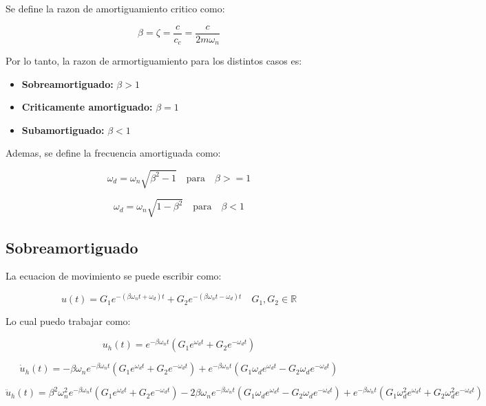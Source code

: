\documentclass{article}  %
\begin{document}
Se define la razon de amortiguamiento critico como:

\begin{equation}
    \beta = \zeta = \frac{c}{c_c} = \frac{c}{2m\omega_n}
\end{equation}

Por lo tanto, la razon de armortiguamiento para los distintos casos es:

\begin{itemize}
    \item \textbf{Sobreamortiguado:} $\beta > 1$
    \item \textbf{Criticamente amortiguado:} $\beta = 1$
    \item \textbf{Subamortiguado:} $\beta < 1$
\end{itemize}

Ademas, se define la frecuencia amortiguada como:

\begin{equation}
    \omega_d = \omega_n \sqrt{\beta^2 - 1} \quad \text{para} \quad \beta >= 1
\end{equation}

\begin{equation}
    \omega_d = \omega_n \sqrt{1 - \beta^2} \quad \text{para} \quad \beta < 1
\end{equation}
\subsection{Sobreamortiguado}

La ecuacion de movimiento se puede escribir como:

\begin{equation}
    u(t) = G_1 e^{-(\beta \omega_n t + \omega_d)t} + G_2 e^{-(\beta \omega_n t - \omega_d)t} \quad G_1, G_2 \in \mathbb{R}
\end{equation}

Lo cual puedo trabajar como:

\begin{equation}
    u_h(t) = e^{-\beta \omega_n t} (G_1 e^{\omega_d t} + G_2 e^{-\omega_d t}) 
\end{equation}

\begin{equation}
    \dot{u}_h(t) = -\beta \omega_n e^{-\beta \omega_n t} (G_1 e^{\omega_d t} + G_2 e^{-\omega_d t}) + e^{-\beta \omega_n t} (G_1 \omega_d e^{\omega_d t} - G_2 \omega_d e^{-\omega_d t})
\end{equation}

\begin{equation}
    \ddot{u}_h(t) = \beta^2 \omega_n^2 e^{-\beta \omega_n t} (G_1 e^{\omega_d t} + G_2 e^{-\omega_d t}) - 2\beta \omega_n e^{-\beta \omega_n t} (G_1 \omega_d e^{\omega_d t} - G_2 \omega_d e^{-\omega_d t}) + e^{-\beta \omega_n t} (G_1 \omega_d^2 e^{\omega_d t} + G_2 \omega_d^2 e^{-\omega_d t})
\end{equation}
\end{document}

